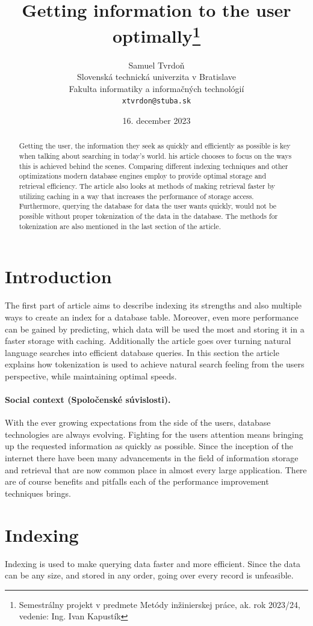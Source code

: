 \documentclass[10pt,twoside,a4paper]{article}
\title{Getting information to the user optimally\thanks{Semestrálny projekt v predmete Metódy inžinierskej práce, ak. rok 2023/24, vedenie: Ing. Ivan Kapustík}}
\author{Samuel Tvrdoň\\[2pt]
	{\small Slovenská technická univerzita v Bratislave}\\
	{\small Fakulta informatiky a informačných technológií}\\
	{\small \texttt{xtvrdon@stuba.sk}}
	}
\date{\small 16. december 2023} %
\begin{document}
\maketitle

\begin{abstract}
Getting the user, the information they seek as quickly and efficiently as possible is key when talking about searching in today’s world. his article chooses to focus on the ways this is achieved behind the scenes. Comparing different indexing techniques and other optimizations modern database engines employ to provide optimal storage and retrieval efficiency. The article also looks at methods of making retrieval faster by utilizing caching in a way that increases the performance of storage access. Furthermore, querying the database for data the user wants quickly, would not be possible without proper tokenization of the data in the database. The methods for tokenization are also mentioned in the last section of the article.
\end{abstract}

\section{Introduction}
The first part of article aims to describe indexing its strengths and also multiple ways to create an index for a database table. Moreover, even more performance can be gained by predicting, which data will be used the most and storing it in a faster storage with caching. Additionally the article goes over turning natural language searches into efficient database queries. In this section the article explains how tokenization is used to achieve natural search feeling from the users perspective, while maintaining optimal speeds.
\paragraph{Social context (Spoločenské súvislosti).}
With the ever growing expectations from the side of the users, database technologies are always evolving\cite{Database-indexing:-yesterday-and-today}. Fighting for the users attention means bringing up the requested information as quickly as possible. Since the inception of the internet there have been many advancements in the field of information storage and retrieval that are now common place in almost every large application. There are of course benefits and pitfalls each of the performance improvement techniques brings.

\section{Indexing}
Indexing is used to make querying data faster and more efficient. Since the data can be any size,
and stored in any order, going over every record is unfeasible.
\end{document}
